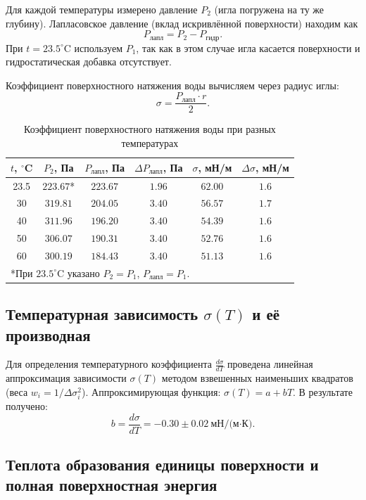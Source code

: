 \documentclass[a4paper]{article}
\begin{document}
	Для каждой температуры измерено давление \(P_2\) (игла погружена на ту же глубину).
	Лапласовское давление (вклад искривлённой поверхности) находим как
	\[
	P_{\text{лапл}} = P_2 - P_{\text{гидр}}.
	\]
	При \(t = 23.5^\circ\text{C}\) используем \(P_1\), так как в этом случае игла касается поверхности
	и гидростатическая добавка отсутствует.
	
	Коэффициент поверхностного натяжения воды вычисляем через радиус иглы:
	\[
	\sigma = \frac{P_{\text{лапл}} \cdot r}{2}.
	\]

	
	\begin{table}[h!]
		\centering
		\caption{Коэффициент поверхностного натяжения воды при разных температурах}
		\label{tab:sigma_water}
		\begin{tabular}{|c|c|c|c|c|c|}
			\hline
			\(t\), \(^\circ\)C & \(P_2\), Па & \(P_{\text{лапл}}\), Па & \(\Delta P_{\text{лапл}}\), Па & \(\sigma\), мН/м & \(\Delta\sigma\), мН/м \\
			\hline
			23.5 & \(223.67\)* & \(223.67\) & \(1.96\) & \(62.00\) & \(1.6\) \\
			30   & \(319.81\)  & \(204.05\) & \(3.40\) & \(56.57\) & \(1.7\) \\
			40   & \(311.96\)  & \(196.20\) & \(3.40\) & \(54.39\) & \(1.6\) \\
			50   & \(306.07\)  & \(190.31\) & \(3.40\) & \(52.76\) & \(1.6\) \\
			60   & \(300.19\)  & \(184.43\) & \(3.40\) & \(51.13\) & \(1.6\) \\
			\hline
			\multicolumn{6}{l}{*При \(23.5^\circ\text{C}\) указано \(P_2 = P_1\), \(P_{\text{лапл}} = P_1\).} \\
		\end{tabular}
	\end{table}
	
	\subsection{Температурная зависимость \(\sigma(T)\) и её производная}
	
	Для определения температурного коэффициента \(\frac{d\sigma}{dT}\) проведена линейная аппроксимация
	зависимости \(\sigma(T)\) методом взвешенных наименьших квадратов (веса \(w_i = 1/\Delta\sigma_i^2\)).
	Аппроксимирующая функция: \(\sigma(T) = a + bT\).
	В результате получено:
	\[
	b = \frac{d\sigma}{dT} = -0.30 \pm 0.02\ \text{мН/(м·К)}.
	\]
	

	
	\subsection{Теплота образования единицы поверхности и полная поверхностная энергия}
	
\end{document}
